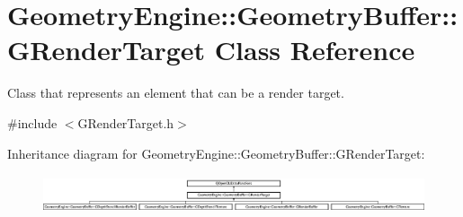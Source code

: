 \hypertarget{class_geometry_engine_1_1_geometry_buffer_1_1_g_render_target}{}\section{Geometry\+Engine\+::Geometry\+Buffer\+::G\+Render\+Target Class Reference}
\label{class_geometry_engine_1_1_geometry_buffer_1_1_g_render_target}


Class that represents an element that can be a render target.  




{\ttfamily \#include $<$G\+Render\+Target.\+h$>$}

Inheritance diagram for Geometry\+Engine\+::Geometry\+Buffer\+::G\+Render\+Target\+:\begin{figure}[H]
\begin{center}
\leavevmode
\includegraphics[height=1.135135cm]{class_geometry_engine_1_1_geometry_buffer_1_1_g_render_target}
\end{center}
\end{figure}
